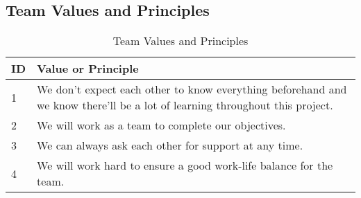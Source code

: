 \documentclass[12pt, titlepage]{article}
\begin{document}
\subsection*{Team Values and Principles}
\begin{table}[H]
\caption{Team Values and Principles}
\begin{tabular}{|l|p{12cm}|}
\hline
\textbf{ID} & \textbf{Value or Principle} \\ \hline
1 & We don’t expect each other to know everything beforehand and we know there'll be a lot of learning throughout this project. \\ \hline
2 & We will work as a team to complete our objectives. \\ \hline
3 & We can always ask each other for support at any time. \\ \hline
4 & We will work hard to ensure a good work-life balance for the team. \\ \hline
\end{tabular}
\label{tab:team-values}
\end{table}
\end{document}
